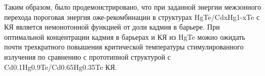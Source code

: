 \documentclass[../main.tex]{subfiles}
\begin{document}
    Таким образом, было продемонстрировано, что при заданной энергии межзонного перехода пороговая энергия оже-рекомбинации в структурах 
    HgTe/CdxHg1-xTe с КЯ является немонотонной функцией от доли кадмия в барьере. При оптимальной концентрации кадмия в барьерах и КЯ из HgTe 
    можно ожидать почти трехкратного повышения критической температуры стимулированного излучения по сравнению с прототипной структурой с 
    Cd0.1Hg0.9Te/Cd0.65Hg0.35Te КЯ.
\end{document}
